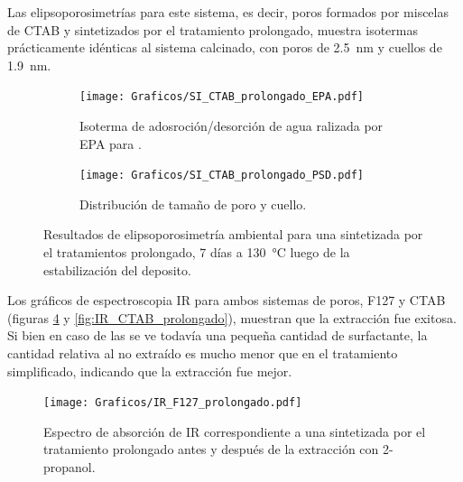 {		Las elipsoporosimetrías para este sistema, es decir, poros formados por miscelas de CTAB y sintetizados por el tratamiento prolongado, muestra isotermas prácticamente idénticas al sistema calcinado, con poros de \SI{2,5}{nm} y cuellos de \SI{1,9}{nm}.
			     
		 \begin{figure}[!ht]
		  	\begin{subfigure}[t]{0.495\textwidth}
		  	\texttt{[image: Graficos/SI\_CTAB\_prolongado\_EPA.pdf]}
			\caption{Isoterma de adosroción/desorción de agua ralizada por EPA para \pdmC\space.}
			\label{fig:CTAB_prolongado_EPA}
			\end{subfigure}
			\begin{subfigure}[t]{0.495\textwidth}
		  	\texttt{[image: Graficos/SI\_CTAB\_prolongado\_PSD.pdf]}
			\caption{Distribución de tamaño de poro y cuello.\\ }
			\label{fig:CTAB_prolongado_PSD}
			\end{subfigure}
			\caption[Elipsoporosimetría \pdmC\space tratamiento prolongado.]{Resultados de elipsoporosimetría ambiental para una \pdmC\space sintetizada por el tratamientos prolongado, 7 días a \SI{130}{\celsius} luego de la estabilización del deposito.}
			\end{figure}

		Los gráficos de espectroscopia IR para ambos sistemas de poros, F127 y CTAB (figuras \ref{fig:IR_F127_prolongado} y \ref{fig:IR_CTAB_prolongado}),  muestran que la extracción fue exitosa. Si bien en caso de las \pdmC\space se ve todavía una pequeña cantidad de surfactante, la cantidad relativa al no extraído es mucho menor que en el tratamiento simplificado, indicando que la extracción fue mejor. %
		
		\begin{figure}[!ht]
			\begin{center}
			\texttt{[image: Graficos/IR\_F127\_prolongado.pdf]}
			\caption[FTIR \pdmF\space tratamiento prolongado.]{Espectro de absorción de IR correspondiente a una \pdmF\space sintetizada por el tratamiento prolongado antes y después de la extracción con 2-propanol.}
			\label{fig:IR_F127_prolongado}
			\end{center}
			\end{figure}
		
}

